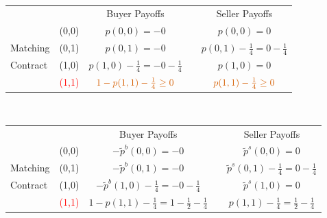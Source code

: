 \documentclass[12pt,letterpaper]{article}           %
\begin{document}
$ $

\newpage


\begin{table}[]
	\begin{tabular}{lcccc}
		&                            & Buyer Payoffs         &                       & Seller Payoffs        \\ \cline{3-3} \cline{5-5} 
		& \multicolumn{1}{c|}{(0,0)} & \multicolumn{1}{c|}{$p(0,0)= -0$} & \multicolumn{1}{c|}{} & \multicolumn{1}{c|}{$p(0,0)=  0$} \\ \cline{3-3} \cline{5-5} 
		Matching & \multicolumn{1}{c|}{(0,1)} & \multicolumn{1}{c|}{$p(0,1)= -0$} & \multicolumn{1}{c|}{} & \multicolumn{1}{c|}{$p(0,1) -\frac{1}{4}= 0 -\frac{1}{4}$}  \\ \cline{3-3} \cline{5-5} 
		Contract& \multicolumn{1}{c|}{(1,0)} & \multicolumn{1}{c|}{$ p(1,0) - \frac{1}{4}= - 0 - \frac{1}{4}$} & \multicolumn{1}{c|}{} & \multicolumn{1}{c|}{$p(1,0)=  0$} \\ \cline{3-3} \cline{5-5} 
		& \multicolumn{1}{c|}{\textcolor{red}{(1,1)}} & \multicolumn{1}{c|}{$ \textcolor{red}{1 - p(1,1) - \frac{1}{4}\geq0}$} & \multicolumn{1}{c|}{} & \multicolumn{1}{c|}{$\textcolor{red}{p(1,1) - \frac{1}{4}\geq 0}$} \\ \cline{3-3} \cline{5-5} 
	\end{tabular}
\end{table}


$ $

\newpage


\begin{table}[]
	\begin{tabular}{lcccc}
		&                            & Buyer Payoffs         &                       & Seller Payoffs        \\ \cline{3-3} \cline{5-5} 
		& \multicolumn{1}{c|}{(0,0)} & \multicolumn{1}{c|}{$-\tilde{p}^b(0,0)= -0$} & \multicolumn{1}{c|}{} & \multicolumn{1}{c|}{$\tilde{p}^s(0,0)=  0$} \\ \cline{3-3} \cline{5-5} 
		Matching & \multicolumn{1}{c|}{(0,1)} & \multicolumn{1}{c|}{$-\tilde{p}^b(0,1)= -0$} & \multicolumn{1}{c|}{} & \multicolumn{1}{c|}{$\tilde{p}^s(0,1) -\frac{1}{4}= 0 -\frac{1}{4}$}  \\ \cline{3-3} \cline{5-5} 
		Contract& \multicolumn{1}{c|}{(1,0)} & \multicolumn{1}{c|}{$ -\tilde{p}^b(1,0) - \frac{1}{4}= - 0 - \frac{1}{4}$} & \multicolumn{1}{c|}{} & \multicolumn{1}{c|}{$\tilde{p}^s(1,0)=  0$} \\ \cline{3-3} \cline{5-5} 
		& \multicolumn{1}{c|}{\textcolor{red}{(1,1)}} & \multicolumn{1}{c|}{$  1 -p(1,1) - \frac{1}{4} = 1 - \frac{1}{2}- \frac{1}{4}$} & \multicolumn{1}{c|}{} & \multicolumn{1}{c|}{$ p(1,1) - \frac{1}{4}= \frac{1}{2}- \frac{1}{4}$} \\ \cline{3-3} \cline{5-5} 
	\end{tabular}
\end{table}
\end{document}
